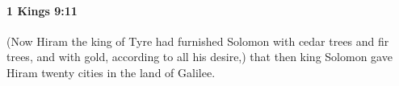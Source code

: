 
		\paragraph{1 Kings 9:11} %
			\label{1KINGS-9-11}

			(Now Hiram the king of Tyre had furnished Solomon with cedar trees and fir trees, and with gold, according to all his desire,) that then king Solomon gave Hiram twenty cities in the land of Galilee.


